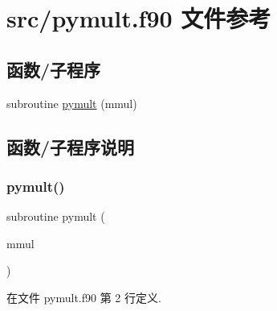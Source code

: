 \hypertarget{pymult_8f90}{}\section{src/pymult.f90 文件参考}
\label{pymult_8f90}
\subsection*{函数/子程序}
\begin{DoxyCompactItemize}
\item 
subroutine \mbox{\hyperlink{pymult_8f90_a20d9f35a0a873dc804bd38ec6a9e95eb}{pymult}} (mmul)
\end{DoxyCompactItemize}


\subsection{函数/子程序说明}
\mbox{\label{pymult_8f90_a20d9f35a0a873dc804bd38ec6a9e95eb}} 
\subsubsection{\texorpdfstring{pymult()}{pymult()}}
{\footnotesize\ttfamily subroutine pymult (\begin{DoxyParamCaption}\item[{}]{mmul }\end{DoxyParamCaption})}



在文件 pymult.\+f90 第 2 行定义.

